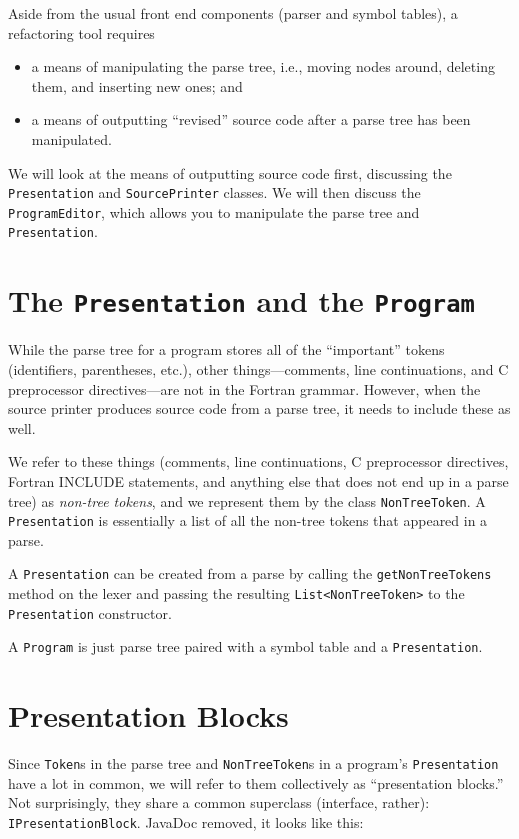 
Aside from the usual front end components (parser and symbol tables), a
refactoring tool requires
\begin{itemize}
\item a means of manipulating the parse tree, i.e., moving nodes around,
deleting them, and inserting new ones; and
\item a means of outputting ``revised'' source code after a parse tree has
been manipulated.
\end{itemize}

We will look at the means of outputting source code first, discussing
the \texttt{Presentation} and \texttt{SourcePrinter} classes.
We will then discuss the \texttt{ProgramEditor}, which allows you to
manipulate the parse tree and \texttt{Presentation}.

\section{The \texttt{Presentation} and the \texttt{Program}}

While the parse tree for a program stores all of the ``important'' tokens
(identifiers, parentheses, etc.), other things---comments, line continuations,
and C preprocessor directives---are not in the Fortran grammar.  However,
when the source printer produces source code from a parse tree, it needs to
include these as well.

We refer to these things (comments, line continuations, C preprocessor
directives, Fortran INCLUDE statements, and anything else that does not
end up in a parse tree) as \textit{non-tree tokens}, and we represent them
by the class \texttt{NonTreeToken}.  A \texttt{Presentation} is essentially
a list of all the non-tree tokens that appeared in a parse.

A \texttt{Presentation} can be created from a parse by calling the
\texttt{getNonTreeTokens} method on the lexer and passing the resulting
\texttt{List<NonTreeToken>} to the \texttt{Presentation} constructor.

A \texttt{Program} is just parse tree paired with a symbol table and a
\texttt{Presentation}.

\section{Presentation Blocks}

Since \texttt{Token}s in the parse tree and \texttt{NonTreeToken}s in
a program's \texttt{Presentation} have a lot in common, we will refer to
them collectively as ``presentation blocks.''  Not surprisingly, they
share a common superclass (interface, rather): \texttt{IPresentationBlock}.
JavaDoc removed, it looks like this:

